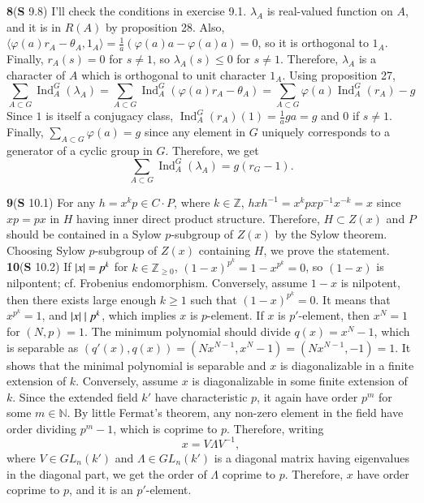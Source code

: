 \documentclass[a4paper, 12pt]{article}
\theoremstyle{Mydefinition}
\theoremstyle{Mytheorem}
\DeclareMathOperator{\Ind}{Ind}
\begin{document}
\noindent \textbf{8}(\textbf{S} 9.8)
I'll check the conditions in exercise 9.1. $\lambda_A$ is real-valued function on $A$, and it is in $R(A)$ by proposition 28. Also, $\langle \varphi(a)r_A - \theta_A, 1_A\rangle = \frac{1}{a}(\varphi(a)a - \varphi(a)a) = 0$, so it is orthogonal to $1_A$. Finally, $r_A(s)=0$ for $s\neq 1$, so $\lambda_A(s)\leq 0$ for $s\neq 1$. Therefore, $\lambda_A$ is a character of $A$ which is orthogonal to unit character $1_A$. Using proposition 27,
\begin{equation}
    \sum_{A\subset G}\Ind_A^G(\lambda_A) = \sum_{A\subset G}\Ind_A^G(\varphi(a)r_A - \theta_A) = \sum_{A\subset G}\varphi(a)\Ind_A^G(r_A) - g
\end{equation}
Since $1$ is itself a conjugacy class, $\Ind_A^G(r_A)(1) = \frac{1}{a}ga = g$ and $0$ if $s\neq 1$. Finally, $\sum_{A\subset G}\varphi(a) = g$ since any element in $G$ uniquely corresponds to a generator of a cyclic group in $G$. Therefore, we get
\begin{equation}
    \sum_{A\subset G}\Ind_A^G(\lambda_A) = g(r_G-1).
\end{equation}
 
\noindent \textbf{9}(\textbf{S} 10.1)
For any $h = x^k p\in C\cdot P$, where $k\in\mathbb{Z}$, $hxh^{-1} = x^kpxp^{-1}x^{-k} = x$ since $xp=px$ in $H$ having inner direct product structure. Therefore, $H\subset Z(x)$ and $P$ should be contained in a Sylow $p$-subgroup of $Z(x)$ by the Sylow theorem. Choosing Sylow $p$-subgroup of $Z(x)$ containing $H$, we prove the statement.\\

\noindent \textbf{10}(\textbf{S} 10.2)
If $\abs{x} = p^k$ for $k\in\mathbb{Z}_{\geq 0}$, $(1-x)^{p^k} = 1-x^{p^k} = 0$, so $(1-x)$ is nilpontent; cf. Frobenius endomorphism. Conversely, assume $1-x$ is nilpotent, then there exists large enough $k\geq 1$ such that $(1-x)^{p^k} = 0$. It means that $x^{p^k} = 1$, and $\abs{x}\mid p^k$, which implies $x$ is $p$-element.
If $x$ is $p'$-element, then $x^N = 1$ for $(N, p)=1$. The minimum polynomial should divide $q(x) = x^N-1$, which is separable as $(q'(x), q(x)) = (Nx^{N-1}, x^N-1) = (Nx^{N-1}, -1) = 1$. It shows that the minimal polynomial is separable and $x$ is diagonalizable in a finite extension of $k$. Conversely, assume $x$ is diagonalizable in some finite extension of $k$. Since the extended field $k'$ have characteristic $p$, it again have order $p^m$ for some $m\in\mathbb{N}$. By little Fermat's theorem, any non-zero element in the field have order dividing $p^m-1$, which is coprime to $p$. Therefore, writing
\begin{equation}
    x = V\Lambda V^{-1},
\end{equation}
where $V\in GL_n(k')$ and $\Lambda\in GL_n(k')$ is a diagonal matrix having eigenvalues in the diagonal part, we get the order of $\Lambda$ coprime to $p$. Therefore, $x$ have order coprime to $p$, and it is an $p'$-element.
\end{document}
